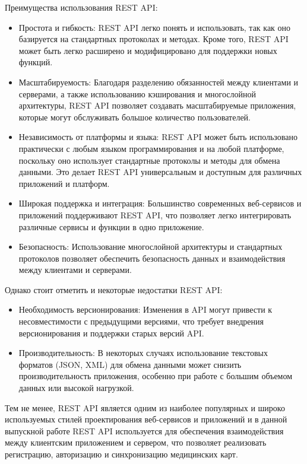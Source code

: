 Преимущества использования REST API:
\begin{itemize}
    \item Простота и гибкость: REST API легко понять и использовать, так как оно базируется на стандартных протоколах и методах. Кроме того, REST API может быть легко расширено и модифицировано для поддержки новых функций.

    \item Масштабируемость: Благодаря разделению обязанностей между клиентами и серверами, а также использованию кэширования и многослойной архитектуры, REST API позволяет создавать масштабируемые приложения, которые могут обслуживать большое количество пользователей.
    \item Независимость от платформы и языка: REST API может быть использовано практически с любым языком программирования и на любой платформе, поскольку оно использует стандартные протоколы и методы для обмена данными. Это делает REST API универсальным и доступным для различных приложений и платформ.

    \item Широкая поддержка и интеграция: Большинство современных веб-сервисов и приложений поддерживают REST API, что позволяет легко интегрировать различные сервисы и функции в одно приложение.

    \item Безопасность: Использование многослойной архитектуры и стандартных протоколов позволяет обеспечить безопасность данных и взаимодействия между клиентами и серверами.
\end{itemize}

Однако стоит отметить и некоторые недостатки REST API:

\begin{itemize}
    \item Необходимость версионирования: Изменения в API могут привести к несовместимости с предыдущими версиями, что требует внедрения версионирования и поддержки старых версий API.

    \item Производительность: В некоторых случаях использование текстовых форматов (JSON, XML) для обмена данными может снизить производительность приложения, особенно при работе с большим объемом данных или высокой нагрузкой.
\end{itemize}

Тем не менее, REST API является одним из наиболее популярных и широко используемых стилей проектирования веб-сервисов и приложений и в данной выпускной работе REST API используется для обеспечения взаимодействия между клиентским приложением и сервером, что позволяет реализовать регистрацию, авторизацию и синхронизацию медицинских карт.